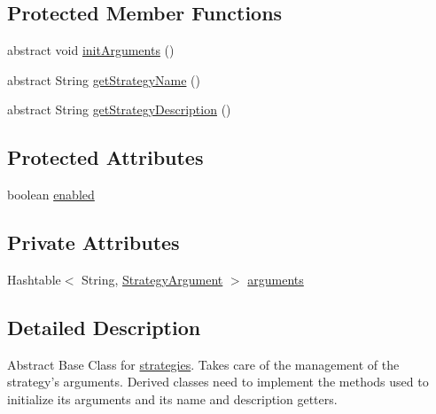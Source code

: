 \subsection*{Protected Member Functions}
\begin{DoxyCompactItemize}
\item 
abstract void \hyperlink{classch_1_1zhaw_1_1ba10__bsha__1_1_1strategies_1_1BaseStrategy_a0496e8fd0099a5f0f7765322d7e752a9}{initArguments} ()
\item 
abstract String \hyperlink{classch_1_1zhaw_1_1ba10__bsha__1_1_1strategies_1_1BaseStrategy_aa0ebed55eed45409bad13d43a0058780}{getStrategyName} ()
\item 
abstract String \hyperlink{classch_1_1zhaw_1_1ba10__bsha__1_1_1strategies_1_1BaseStrategy_a75fdb36932ad701f6375cc1fe718056b}{getStrategyDescription} ()
\end{DoxyCompactItemize}
\subsection*{Protected Attributes}
\begin{DoxyCompactItemize}
\item 
boolean \hyperlink{classch_1_1zhaw_1_1ba10__bsha__1_1_1strategies_1_1BaseStrategy_a5799e7f094efcf8d18d8788e9c911787}{enabled}
\end{DoxyCompactItemize}
\subsection*{Private Attributes}
\begin{DoxyCompactItemize}
\item 
Hashtable$<$ String, \hyperlink{classch_1_1zhaw_1_1ba10__bsha__1_1_1StrategyArgument}{StrategyArgument} $>$ \hyperlink{classch_1_1zhaw_1_1ba10__bsha__1_1_1strategies_1_1BaseStrategy_ac15d972a209d299069ce7d7940e9322e}{arguments}
\end{DoxyCompactItemize}


\subsection{Detailed Description}
Abstract Base Class for \hyperlink{namespacech_1_1zhaw_1_1ba10__bsha__1_1_1strategies}{strategies}. Takes care of the management of the strategy's arguments. Derived classes need to implement the methods used to initialize its arguments and its name and description getters.

